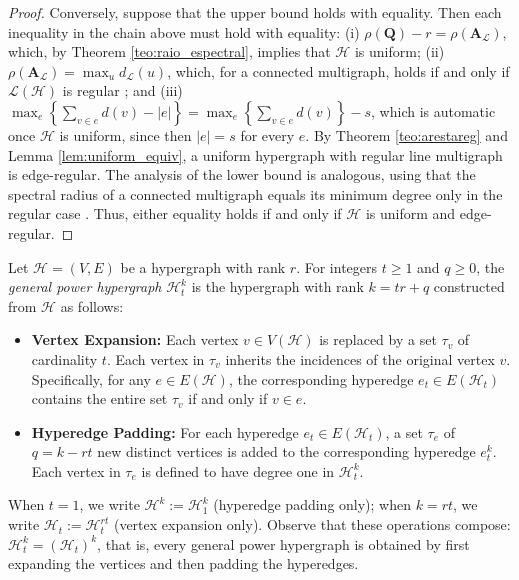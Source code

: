 \documentclass[12pt,reqno]{amsart}
\begin{document}
\begin{proof}
Conversely, suppose that the upper bound holds with equality. Then each inequality in the chain above must hold with equality: (i) $\rho(\mathbf{Q}) - r = \rho(\mathbf{A}_{\mathcal{L}})$, which, by Theorem \ref{teo:raio_espectral}, implies that $\mathcal{H}$ is uniform; (ii) $\rho(\mathbf{A}_{\mathcal{L}}) = \max_{u} d_{\mathcal{L}}(u)$, which, for a connected multigraph, holds if and only if $\mathcal{L}(\mathcal{H})$ is regular \cite{Stevanovic}; and (iii) $\max_{e}\left\{\sum_{v \in e} d(v) - |e|\right\} = \max_{e}\left\{\sum_{v \in e} d(v)\right\} - s$, which is automatic once $\mathcal{H}$ is uniform, since then $|e| = s$ for every $e$. By Theorem \ref{teo:arestareg} and Lemma \ref{lem:uniform_equiv}, a uniform hypergraph with regular line multigraph is edge-regular. The analysis of the lower bound is analogous, using that the spectral radius of a connected multigraph equals its minimum degree only in the regular case \cite{Stevanovic}. Thus, either equality holds if and only if $\mathcal{H}$ is uniform and edge-regular.
\end{proof}

\begin{definition}\label{def:general_power}
Let $\mathcal{H}=(V,E)$ be a hypergraph with rank $r$. For integers $t \geq 1$ and $q \geq 0$, the \textit{general power hypergraph} $\mathcal{H}^k_t$ is the hypergraph with rank $k = tr + q$ constructed from $\mathcal{H}$ as follows:
\begin{itemize}
    \item \textbf{Vertex Expansion:} Each vertex $v \in V(\mathcal{H})$ is replaced by a set $\tau_v$ of cardinality $t$. Each vertex in $\tau_v$ inherits the incidences of the original vertex $v$. Specifically, for any $e \in E(\mathcal{H})$, the corresponding hyperedge $e_t \in E(\mathcal{H}_t)$ contains the entire set $\tau_v$ if and only if $v \in e$.
    
    \item \textbf{Hyperedge Padding:} For each hyperedge $e_t \in E(\mathcal{H}_t)$, a set $\tau_e$ of $q = k - rt$ new distinct vertices is added to the corresponding hyperedge $e^k_t$. Each vertex in $\tau_e$ is defined to have degree one in $\mathcal{H}^k_t$.
\end{itemize}
\end{definition}

When $t = 1$, we write $\mathcal{H}^k := \mathcal{H}^k_1$ (hyperedge padding only); when $k = rt$, we write $\mathcal{H}_t := \mathcal{H}^{rt}_t$ (vertex expansion only). Observe that these operations compose: $\mathcal{H}^k_t = (\mathcal{H}_t)^k$, that is, every general power hypergraph is obtained by first expanding the vertices and then padding the hyperedges.
\end{document}
